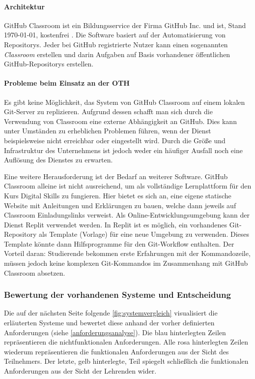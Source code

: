 \paragraph{Architektur}
GitHub Classroom ist ein Bildungsservice der Firma GitHub Inc. und ist, Stand
\today, kostenfrei \parencite{github-classroom-kostenlos}. Die Software basiert
auf der Automatisierung von Repositorys. Jeder bei GitHub registrierte Nutzer
kann einen sogenannten \emph{Classroom} erstellen und darin Aufgaben auf
Basis vorhandener öffentlichen GitHub-Repositorys erstellen.

\paragraph{Probleme beim Einsatz an der OTH}
Es gibt keine Möglichkeit, das System von GitHub Classroom auf einem lokalen
Git-Server zu replizieren. Aufgrund dessen schafft man sich durch die
Verwendung von Classroom eine externe Abhängigkeit an GitHub. Dies kann unter
Umständen zu erheblichen Problemen führen, wenn der Dienst beispielsweise
nicht erreichbar oder eingestellt wird. Durch die Größe und Infrastruktur des
Unternehmens ist jedoch weder ein häufiger Ausfall noch eine Auflösung des
Dienstes zu erwarten.

Eine weitere Herausforderung ist der Bedarf an weiterer Software. GitHub
Classroom alleine ist nicht ausreichend, um als vollständige Lernplattform für
den Kurs Digital Skills zu fungieren. Hier bietet es sich an, eine eigene
statische Website mit Anleitungen und Erklärungen zu bauen, welche dann jeweils
auf Classroom Einladungslinks verweist. Als Online-Entwicklungsumgebung kann der
Dienst Replit verwendet werden. In Replit ist es möglich, ein vorhandenes
Git-Repository als Template (Vorlage) für eine neue Umgebung zu verwenden.
Dieses Template könnte dann Hilfsprogramme für den Git-Workflow enthalten. Der
Vorteil daran: Studierende bekommen erste Erfahrungen mit der Kommandozeile,
müssen jedoch keine komplexen Git-Kommandos im Zusammenhang mit GitHub Classroom
absetzen.

\subsubsection{Bewertung der vorhandenen Systeme und Entscheidung}
Die auf der nächsten Seite folgende \autoref{fig:systemvergleich} visualisiert
die erläuterten Systeme und bewertet diese anhand der vorher definierten
Anforderungen (siehe \autoref{anforderungsanalyse}). Die blau hinterlegten
Zeilen repräsentieren die nichtfunktionalen Anforderungen. Alle rosa
hinterlegten Zeilen wiederum repräsentieren die funktionalen Anforderungen aus
der Sicht des Teilnehmers. Der letzte, gelb hinterlegte, Teil spiegelt
schließlich die funktionalen Anforderungen aus der Sicht der Lehrenden wider.

